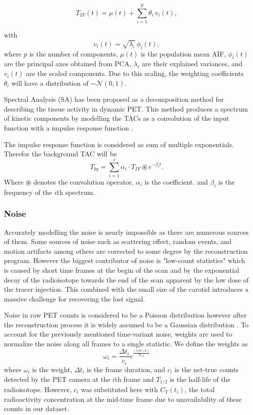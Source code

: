 \begin{equation}
	T_{IF}(t) = \mu(t) + \sum_{i=1}^p \theta_i\,v_i(t),
\end{equation}

with
\[
	v_i(t) = \sqrt{\lambda_i}\,\phi_i(t),
\]
where $p$ is the number of components, \(\mu(t)\) is the population mean AIF, \(\phi_i(t)\) are the principal axes obtained from PCA, \(\lambda_i\) are their explained variances, and \(v_i(t)\) are the scaled components. Due to this scaling, the weighting coefficients \(\theta_i\) will have a distribution of \(\sim \mathcal{N}(0,1)\).

Spectral Analysis (SA) has been proposed as a decomposition method for describing the tissue activity in dynamic PET.
This method produces a spectrum of kinetic components by modelling the TACs as a convolution of the input function with a impulse response function \cite{TODO}.

The impulse response function is considered as sum of multiple exponentials. Therefor the background TAC will be
\[
	T_{bg} = \sum_{i=1}^s \alpha_{i} \cdot T_{IF} \circledast e^{-\beta_{i} t}.
\]
Where $\circledast$ denotes the convolution operator, \(\alpha_i\) is the coefficient. and \(\beta_i\) is the frequency of the \(i\)th spectrum.


\subsubsection{Noise}

Accurately modelling the noise is nearly impossible as there are numerous sources of them.
Some sources of noise such as scattering effect, random events, and motion artifacts among others are corrected to some degree by the reconstruction program.
However the biggest contributor of noise is "low-count statistics" which is caused by short time frames at the begin of the scan and by the exponential decay of the radioisotope towards the end of the scan apparent by the low dose of the tracer injection.
This combined with the small size of the carotid introduces a massive challenge for recovering the lost signal.

Noise in raw PET counts is considered to be a Poisson distribution however after the reconstruction process it is widely assumed to be a Gaussian distribution \cite{TODO}. To account for the previously mentioned time-variant noise, weights are used to normalize the noise along all frames to a single statistic. We define the weights as
\[
	\omega_{i} = \frac{\Delta t_i}{c_i} e^{\frac{-t_{i} ln(2)}{T_{1/2}}}
\]
where \(\omega_i\) is the weight, \(\Delta t_i\) is the frame duration, and \(c_i\) is the net-true counts detected by the PET camera at the \(i\)th frame and  \(T_{1/2}\) is the half-life of the radioisotope.
However, \(c_i\) was substituted here with \(C_T(t_i)\), the total radioactivity concentration at the mid-time frame due to unavailability of these counts in our dataset.

